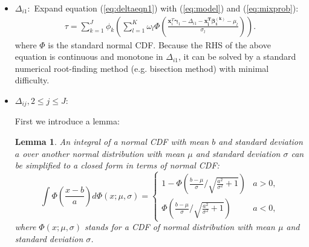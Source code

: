 \documentclass[useAMS,usenatbib,referee]{biom}
\newtheorem{lem}[thm]{Lemma} \newtheorem{pps}[thm]{Proposition}
\begin{document}
\begin{itemize}
\item \textbf{$\Delta_{i1}: $} Expand equation (\ref{eq:deltaeqn1}) with (\ref{eq:model}) and (\ref{eq:mixprob}):
  \begin{align*}
    \tau = \sum_{k = 1}^J \phi_k \left( \sum_{l = 1}^{K} \omega_{l} \Phi \left( \frac{\bm x_{i}^T
        \bm \gamma_1 - \Delta_{i1} -\bm{x_i^T \beta_1^{(k)}} - \mu_{l}}{ \sigma_{l} } \right) \right).
  \end{align*}
  where $\Phi$ is the standard normal CDF.
  Because the RHS of the above equation
  is continuous and monotone in $\Delta_{i1}$, it can be solved by a
  standard numerical root-finding method (e.g. bisection method) with
  minimal difficulty.

\item \textbf{$\Delta_{ij}, 2\leq j \leq J: $}

  First we introduce a lemma:
  \begin{lem}\label{ch3:sec:lemma}
    An integral of a normal CDF with mean $b$ and standard deviation
    $a$ over another normal distribution with mean $\mu$ and standard
    deviation $\sigma$ can be simplified to a closed form in terms of
    normal CDF:
    \begin{displaymath}
      \int \Phi \left( \frac{x-b}{a} \right) d\Phi(x; \mu, \sigma)  =
      \begin{cases}
        1- \Phi \left( \frac{b-\mu}{\sigma} \big /
          \sqrt{\frac{a^2}{\sigma^2}+1} \right) & a > 0, \\
        \Phi \left( \frac{b-\mu}{\sigma} \big /
          \sqrt{\frac{a^2}{\sigma^2}+1} \right) & a < 0,
      \end{cases}
    \end{displaymath}
    where $\Phi(x; \mu, \sigma)$ stands for a CDF of normal
    distribution with mean $\mu$ and standard deviation $\sigma$.
  \end{lem}


\end{itemize}
\end{document}
